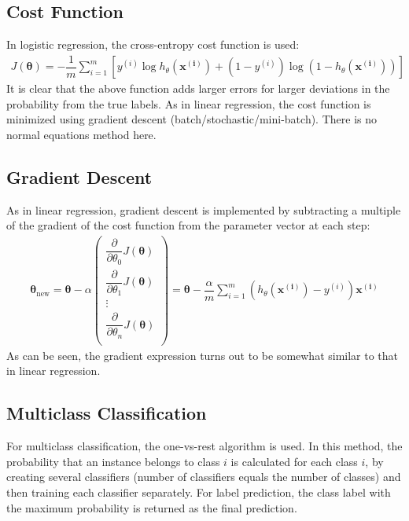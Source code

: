 \documentclass[a4paper, 12pt]{article}
\begin{document}
\subsection{Cost Function}
In logistic regression, the cross-entropy cost function is used:
\begin{align*}
J\left(\bm{\theta}\right) = -\dfrac{1}{m}\sum_{i=1}^{m}\left[y^{\left(i\right)}\log h_{\theta}\left(\bm{x^{\left(i\right)}}\right) + \left(1 - y^{\left(i\right)}\right)\log \left(1 - h_{\theta}\left(\bm{x^{\left(i\right)}}\right)\right)\right]
\end{align*}
It is clear that the above function adds larger errors for larger deviations in the probability from the true labels. As in linear regression, the cost function is minimized using gradient descent (batch/stochastic/mini-batch). There is no normal equations method here.

\subsection{Gradient Descent}
As in linear regression, gradient descent is implemented by subtracting a multiple of the gradient of the cost function from the parameter vector at each step:
\begin{align*}
\bm{\theta}_{\text{new}} = \bm{\theta} - \alpha
\begin{pmatrix}
\dfrac{\partial}{\partial \theta_0}J\left(\bm{\theta}\right) \\
\dfrac{\partial}{\partial \theta_1}J\left(\bm{\theta}\right) \\
\vdots \\
\dfrac{\partial}{\partial \theta_n}J\left(\bm{\theta}\right) \\
\end{pmatrix}
= \bm{\theta} - \dfrac{\alpha}{m}\sum_{i=1}^{m}\left(h_{\theta}\left(\bm{x^{\left(i\right)}}\right)-y^{\left(i\right)}\right)\bm{x^{\left(i\right)}}
\end{align*}
As can be seen, the gradient expression turns out to be somewhat similar to that in linear regression.

\subsection{Multiclass Classification}
For multiclass classification, the one-vs-rest algorithm is used. In this method, the probability that an instance belongs to class $i$ is calculated for each class $i$, by creating several classifiers (number of classifiers equals the number of classes) and then training each classifier separately. For label prediction, the class label with the maximum probability is returned as the final prediction.
\end{document}
